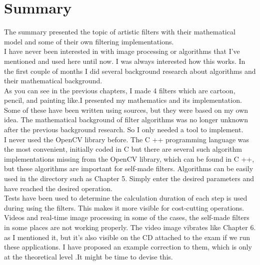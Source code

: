 \documentclass[a4paper,12pt]{article}
\begin{document}
\pagestyle{empty}

\section*{Summary}

The summary  presented the topic of artistic filters with their mathematical model and some of their own filtering implementations.\\

I have never been interested in with image processing or algorithms that I've mentioned and used here until now. I was always interested  how this works. In the first couple of months I did several background research about algorithms and their mathematical background.\\

As you can see in the previous chapters, I made 4 filters which are cartoon, pencil, and painting  like.I presented my mathematics and its implementation. Some of these have been written using sources, but they were based on my own idea. The mathematical background of filter algorithms was no longer unknown after the previous background research.  So I only needed a tool to implement.\\

I never used the OpenCV library before. The C ++ programming language was the most convenient, initially coded in C but there are several such algorithm implementations missing from the OpenCV library, which can be found in C ++, but these algorithms are important for self-made filters. Algorithms can be easily used in the directory such as Chapter 5. Simply enter the desired parameters and have reached the desired operation.\\

Tests have been used to determine the calculation duration of each step is used during using the filters. This makes it more visible for cost-cutting operations. Videos and real-time image processing in some of the cases, the self-made filters in some places are not working properly. The video image vibrates like Chapter 6. as I mentioned it, but it's also visible on the CD attached to the exam if we run these applications. I have proposed an example correction to them, which is  only at the theoretical level .It might be time to devise this.
\end{document}
